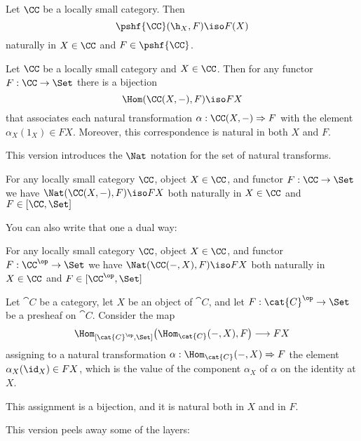 \begin{lemma}[Yoneda]   
\label{yoneda1}
Let $\CC$ be a locally small category.  Then
% 
\begin{equation}        
\label{eq:yoneda}
\pshf{\CC}(\h_X, F)
\iso
F(X)
\end{equation}
% 
naturally in $X \in \CC$ and $F \in \pshf{\CC}$.  
\end{lemma}

\begin{lemma}[Yoneda]\label{yoneda2} Let $\CC$ be a locally small category and $X \in
\CC$. Then for any functor $F : \CC \to \Set$ there is a bijection
$$
\Hom(\CC(X,-), F) \iso FX
$$
that associates each natural transformation $\alpha:\CC(X,-) \Rightarrow F$ with the element
$\alpha_X(1_X) \in FX$. Moreover, this correspondence is natural in both $X$ and $F$.
\end{lemma}

\noindent This version introduces the $\Nat$ notation for the set of natural transforms.

\begin{lemma}[Yoneda]\label{yoneda3} For any locally small category $\CC$, object $X
\in \CC$, and functor $F:\CC \to \Set$ we have  $\Nat(\CC(X,-),F) \iso FX$
both naturally in $X \in \CC$ and $F \in [\CC, \Set]$
\end{lemma}

\noindent You can also write that one a dual way:

\begin{lemma}[Yoneda]\label{yoneda4} For any locally small category $\CC$, object
$X \in \CC$, and functor $F:\CC^{\op} \to \Set$ we have  $\Nat(\CC(-,X),F)
\iso FX$ both naturally in $X \in \CC$ and $F \in [\CC^{\op}, \Set]$
\end{lemma}

\begin{lemma}[Yoneda]\label{yoneda5}
 Let $\cat{C}$ be a category, let $X$ be an object of $\cat{C}$, and let $F:\cat{C}^\op\to\Set$ be a presheaf on $\cat{C}$. 
 Consider the map 
 $$
 \Hom_{[\cat{C}^\op,\Set]} \bigl(\Hom_\cat{C} (-,X) , F \bigr) \longrightarrow FX
 $$
 assigning to a natural transformation $\alpha:\Hom_\cat{C} (-,X)\Rightarrow F$ the element $\alpha_X(\id_X)\in FX$, which is the value of the component $\alpha_X$ of $\alpha$ on the identity at $X$. 

 This assignment is a bijection, and it is natural both in $X$ and in $F$.
\end{lemma}

\noindent\goodbreak
This version peels away some of the layers:

